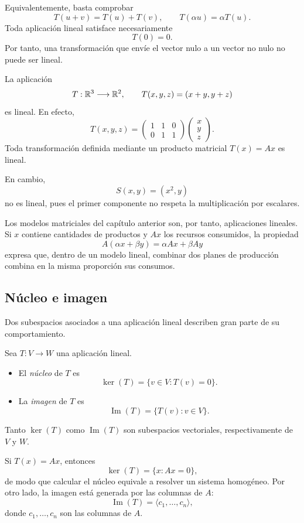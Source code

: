Equivalentemente, basta comprobar
\[
T(u+v)=T(u)+T(v),
\qquad
T(\alpha u)=\alpha T(u).
\]
Toda aplicación lineal satisface necesariamente
\[
T(0)=0.
\]
Por tanto, una transformación que envíe el vector nulo a un vector no nulo no puede ser lineal.

\begin{example}
La aplicación
\[
T:\mathbb{R}^3\longrightarrow\mathbb{R}^2,
\qquad
T(x,y,z)=(x+y,y+z)
\]
es lineal. En efecto,
\[
T(x,y,z)
=
\begin{pmatrix}
1&1&0\\
0&1&1
\end{pmatrix}
\begin{pmatrix}x\\y\\z\end{pmatrix}.
\]
Toda transformación definida mediante un producto matricial $T(x)=Ax$ es lineal.

En cambio,
\[
S(x,y)=(x^2,y)
\]
no es lineal, pues el primer componente no respeta la multiplicación por escalares.
\end{example}

Los modelos matriciales del capítulo anterior son, por tanto, aplicaciones lineales. Si $x$ contiene cantidades de productos y $Ax$ los recursos consumidos, la propiedad
\[
A(\alpha x+\beta y)=\alpha Ax+\beta Ay
\]
expresa que, dentro de un modelo lineal, combinar dos planes de producción combina en la misma proporción sus consumos.

\subsection{Núcleo e imagen}

Dos subespacios asociados a una aplicación lineal describen gran parte de su comportamiento.

\begin{definition}
Sea $T:V\to W$ una aplicación lineal.
\begin{itemize}
\item El \emph{núcleo} de $T$ es
\[
\ker(T)=\{v\in V:T(v)=0\}.
\]
\item La \emph{imagen} de $T$ es
\[
\operatorname{Im}(T)=\{T(v):v\in V\}.
\]
\end{itemize}
\end{definition}

Tanto $\ker(T)$ como $\operatorname{Im}(T)$ son subespacios vectoriales, respectivamente de $V$ y $W$.

Si $T(x)=Ax$, entonces
\[
\ker(T)=\{x:Ax=0\},
\]
de modo que calcular el núcleo equivale a resolver un sistema homogéneo. Por otro lado, la imagen está generada por las columnas de $A$:
\[
\operatorname{Im}(T)
=
\langle c_1,\ldots,c_n\rangle,
\]
donde $c_1,\ldots,c_n$ son las columnas de $A$.

